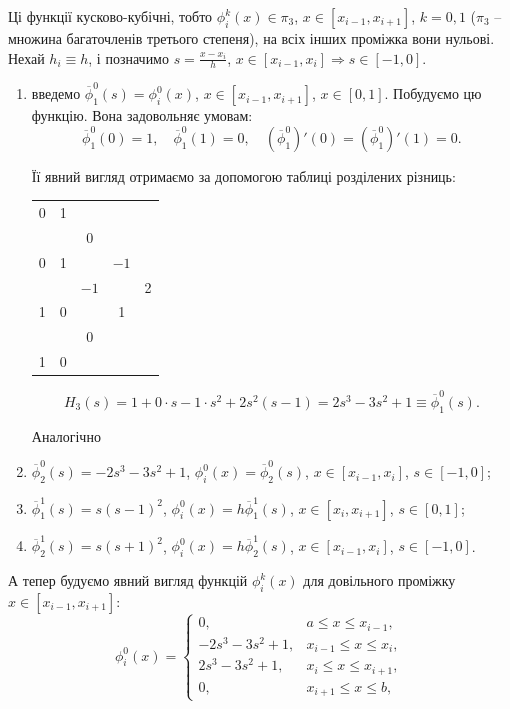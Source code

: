 Ці функції кусково-кубічні, тобто $\phi_i^k(x)\in \pi_3$, $x\in[x_{i-1},x_{i+1}]$, $k=0,1$ ($\pi_3$ -- множина багаточленів третього степеня), на всіх інших проміжка вони нульові. Нехай $h_i \equiv h$, і позначимо $s = \frac{x-x_i}{h}$, $x\in[x_{i-1},x_i] \Rightarrow s \in [-1,0]$. 

\begin{enumerate}
    \item введемо $\overline{\phi}_1^0(s) = \phi_i^0(x)$, $x\in[x_{i-1},x_{i+1}]$, $x\in[0,1]$. Побудуємо цю функцію. Вона задовольняє умовам:
    \[ \overline{\phi}_1^0(0) = 1, \quad \overline{\phi}_1^0(1) = 0,\quad (\overline{\phi}_1^0)'(0)=(\overline{\phi}_1^0)'(1)=0.\]

    Її явний вигляд отримаємо за допомогою таблиці розділених різниць:
    \begin{table}[H]
        \centering
        \begin{tabular}{c|cccc}
            0 & 1 & & & \\
            & & 0 & & \\
            0 & 1 & & $-1$ & \\
            & & $-1$ & & 2 \\
            1 & 0 & & 1 & \\
            & & 0 & & \\
            1 & 0 & & & \\
        \end{tabular}
    \end{table}
    
    \[ H_3(s) = 1 + 0 \cdot s - 1 \cdot s^2 + 2 s^2(s-1) = 2s^3 - 3s^2 + 1 \equiv \overline{\phi}_1^0(s).\]

    Аналогічно
    \item $\overline{\phi}_2^0(s) = -2s^3 - 3s^2 + 1$, $\phi_i^0(x) = \overline{\phi}_2^0(s)$, $x\in [x_{i-1},x_i]$, $s\in[-1,0]$;
    \item $\overline{\phi}_1^1(s) = s(s-1)^2$, $\phi_i^0(x) = h\overline{\phi}_1^1(s)$, $x\in [x_i,x_{i+1}]$, $s\in[0,1]$;
    \item $\overline{\phi}_2^1(s) = s(s+1)^2$, $\phi_i^0(x) = h\overline{\phi}_2^1(s)$, $x\in [x_{i-1},x_i]$, $s\in[-1,0]$.
\end{enumerate} 

А тепер будуємо явний вигляд функцій $\phi_i^k(x)$ для довільного проміжку $x\in[x_{i-1},x_{i+1}]$:
\[ \phi_i^0(x) = \begin{cases} 0, & a \le x \le x_{i-1}, \\ -2s^3-3s^2+1, & x_{i-1}\le x\le x_i, \\ 2s^3-3s^2+1, & x_i\le x\le x_{i+1}, \\ 0, & x_{i+1} \le x \le b, \end{cases} \]

